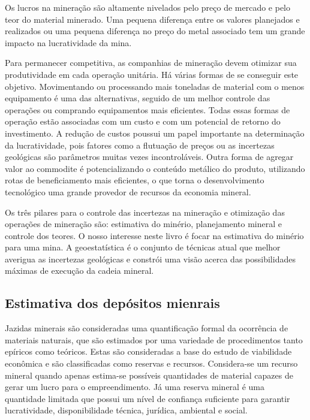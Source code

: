  Os lucros na mineração são altamente nivelados pelo preço de mercado e pelo teor do material minerado. Uma pequena diferença entre os valores planejados e realizados ou uma pequena diferença no preço do metal associado tem um grande impacto na lucratividade da mina. 
 
 Para permanecer competitiva, as companhias de mineração devem otimizar sua produtividade em cada operação unitária. Há várias formas de se conseguir este objetivo. Movimentando ou processando mais toneladas de material com o menos equipamento é uma das alternativas, seguido de um melhor controle das operações ou comprando equipamentos mais eficientes. Todas essas formas de operação estão associadas com um custo e  com um potencial de retorno do investimento. A redução de custos poussui um papel importante na determinação da lucratividade, pois fatores como a flutuação de preços ou as incertezas geológicas são parâmetros muitas vezes incontroláveis. Outra forma de agregar valor ao commodite é potencializando o conteúdo metálico do produto, utilizando rotas de beneficiamento mais eficientes, o que torna o desenvolvimento tecnológico uma grande provedor de recursos da economia mineral. 
 
 Os três pilares para o controle das incertezas na mineração e otimização das operações de mineração são: estimativa do minério, planejamento mineral e controle dos teores. O nosso interesse neste livro é focar na estimativa do minério para uma mina. A geoestatística é o conjunto de técnicas atual que melhor averigua as incertezas geológicas e constrói uma visão acerca das possibilidades máximas de execução da cadeia mineral. 
 
 \subsection{Estimativa dos depósitos mienrais}

Jazidas minerais são consideradas uma quantificação formal da ocorrência de materiais naturais, que são estimados por uma variedade de procedimentos tanto epíricos como teóricos. Estas são consideradas a base do estudo de viabilidade econômica  e são classificadas como reservas e recursos. Considera-se um recurso mineral quando apenas estima-se possíveis quantidades de material capazes de gerar um lucro para o empreendimento. Já uma reserva mineral é uma quantidade limitada que possui um nível de confiança suficiente para garantir lucratividade, disponibilidade técnica, jurídica, ambiental e social. 

